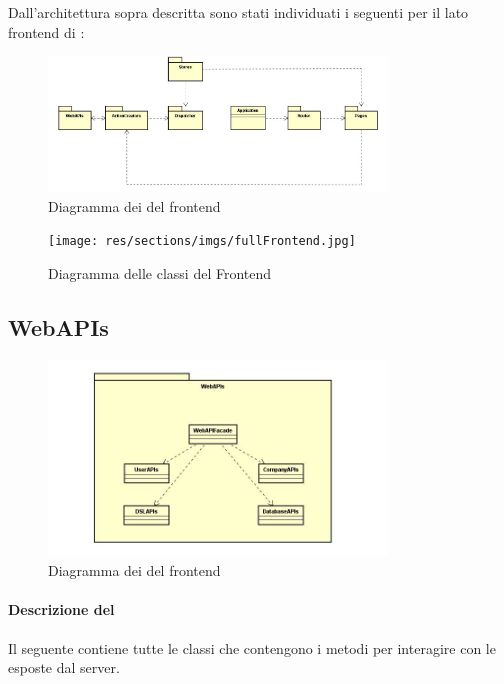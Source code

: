 Dall'architettura sopra descritta sono stati individuati i seguenti  per il lato frontend di :

\begin{figure}[h]
\centering
\includegraphics[width=0.8\textwidth]{res/sections/imgs/packages-diagram.jpg}
\caption{Diagramma dei  del frontend}
\end{figure}

\begin{figure}[h]
\centering
\texttt{[image: res/sections/imgs/fullFrontend.jpg]}
\caption{Diagramma delle classi del Frontend}
\end{figure}

\subsection{WebAPIs}

\begin{figure}[h]
\centering
\includegraphics[width=0.8\textwidth]{res/sections/imgs/webapi-diagram.jpg}
\caption{Diagramma dei  del frontend}
\end{figure}

\paragraph*{Descrizione del }
Il seguente  contiene tutte le classi che contengono i metodi per interagire con le  esposte dal server. 
